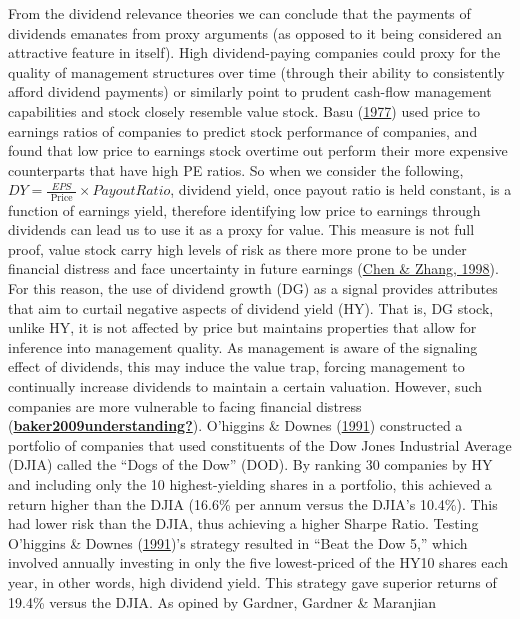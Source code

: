 \documentclass[10pt,preprint, authoryear]{elsarticle}
\numberwithin{equation}{section}
\numberwithin{figure}{section}
\numberwithin{table}{section}
\begin{document}
From the dividend relevance theories we can conclude that the payments
of dividends emanates from proxy arguments (as opposed to it being
considered an attractive feature in itself). High dividend-paying
companies could proxy for the quality of management structures over time
(through their ability to consistently afford dividend payments) or
similarly point to prudent cash-flow management capabilities and stock
closely resemble value stock. Basu
(\protect\hyperlink{ref-basu1977investment}{1977}) used price to
earnings ratios of companies to predict stock performance of companies,
and found that low price to earnings stock overtime out perform their
more expensive counterparts that have high PE ratios. So when we
consider the following,
\(D Y=\frac{E P S}{\text { Price }} \times Payout Ratio\), dividend
yield, once payout ratio is held constant, is a function of earnings
yield, therefore identifying low price to earnings through dividends can
lead us to use it as a proxy for value. This measure is not full proof,
value stock carry high levels of risk as there more prone to be under
financial distress and face uncertainty in future earnings
(\protect\hyperlink{ref-chen1998risk}{Chen \& Zhang, 1998}). For this
reason, the use of dividend growth (DG) as a signal provides attributes
that aim to curtail negative aspects of dividend yield (HY). That is, DG
stock, unlike HY, it is not affected by price but maintains properties
that allow for inference into management quality. As management is aware
of the signaling effect of dividends, this may induce the value trap,
forcing management to continually increase dividends to maintain a
certain valuation. However, such companies are more vulnerable to facing
financial distress
(\protect\hyperlink{ref-baker2009understanding}{\textbf{baker2009understanding?}}).
O'higgins \& Downes (\protect\hyperlink{ref-o1991beating}{1991})
constructed a portfolio of companies that used constituents of the Dow
Jones Industrial Average (DJIA) called the ``Dogs of the Dow'' (DOD). By
ranking 30 companies by HY and including only the 10 highest-yielding
shares in a portfolio, this achieved a return higher than the DJIA
(16.6\% per annum versus the DJIA's 10.4\%). This had lower risk than
the DJIA, thus achieving a higher Sharpe Ratio. Testing O'higgins \&
Downes (\protect\hyperlink{ref-o1991beating}{1991})'s strategy resulted
in ``Beat the Dow 5,'' which involved annually investing in only the
five lowest-priced of the HY10 shares each year, in other words, high
dividend yield. This strategy gave superior returns of 19.4\% versus the
DJIA. As opined by Gardner, Gardner \& Maranjian
\end{document}
